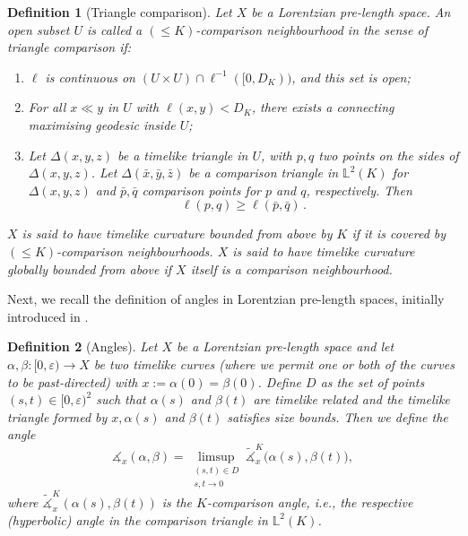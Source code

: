 \documentclass[hidelinks,12pt,a4paper]{article}
\numberwithin{equation}{section}
\theoremstyle{plain}
\newtheorem{definition}{Definition}[section]
\theoremstyle{definition}
\newcommand{\eps}{\varepsilon}
\newcommand{\lm}[1]{\mathbb{L}^2(#1)}
\newcommand{\LpLS}{Lo\-rentz\-ian pre-length space }
\newcommand{\LpLSn}{Lo\-rentz\-ian pre-length space}
\newcommand{\LpLSsn}{Lo\-rentz\-ian pre-length spaces}
\newcommand{\ma}{\ensuremath{\measuredangle}}
\begin{document}
\begin{definition}[Triangle comparison]
\label{def: triangle comparison}
Let $X$ be a \LpLSn. An open subset $U$ is called a $(\leq K)$-comparison neighbourhood in the sense of triangle comparison if:
\begin{enumerate}[label=(\roman*)]
\item $\ell$ is continuous on $(U\times U) \cap \ell^{-1}([0,D_K))$, and this set is open; 
\item For all $x \ll y$ in $U$ with $\ell(x,y)<D_K$, there exists a connecting maximising geodesic inside $U$;
\item Let $\Delta (x,y,z)$ be a timelike triangle in $U$, with $p,q$ two points on the sides of $\Delta (x,y,z)$. Let $\Delta(\bar{x}, \bar{y}, \bar{z})$ be a comparison triangle in $\lm{K}$ for $\Delta (x,y,z)$ and $\bar{p},\bar{q}$ comparison points for $p$ and $q$, respectively. Then 
\begin{equation*}
\label{eq: timelike triangle comparison inequality}
\ell(p,q) \geq \ell(\bar{p}, \bar{q}) \, .
\end{equation*}
\end{enumerate}
$X$ is said to have timelike curvature bounded from above by $K$ if it is covered by $(\leq K)$-comparison neighbourhoods. 
$X$ is said to have timelike curvature globally bounded from above if $X$ itself is a comparison neighbourhood. 
\end{definition}

Next, we recall the definition of angles in \LpLSsn, initially introduced in \cite{BS23}.

\begin{definition}[Angles]
Let $X$ be a \LpLS and let $\alpha,\beta\colon [0,\eps)\rightarrow X$ be two timelike curves (where we permit one or both of the curves to be past-directed) with $x:=\alpha(0)=\beta(0)$.
Define $D$ as the set of points $(s,t) \in [0,\eps)^2$ such that $\alpha(s)$ and $\beta(t)$ are timelike related and the timelike triangle formed by $x, \alpha(s)$ and $\beta(t)$ satisfies size bounds. 
Then we define the \emph{angle} 
\begin{equation}
\label{eq: def angle}
\ma_x(\alpha,\beta)=\limsup_{\substack{(s,t)\in D \\ s,t\to 0}}\tilde{\ma}_x^{K}\big(\alpha(s),\beta(t)\big),
\end{equation}
where $\tilde{\ma}_x^{K}(\alpha(s),\beta(t))$ is the \emph{$K$-comparison angle}, i.e., the respective (hyperbolic) angle in the comparison triangle in $\lm{K}$. 
\end{definition}
\end{document}
